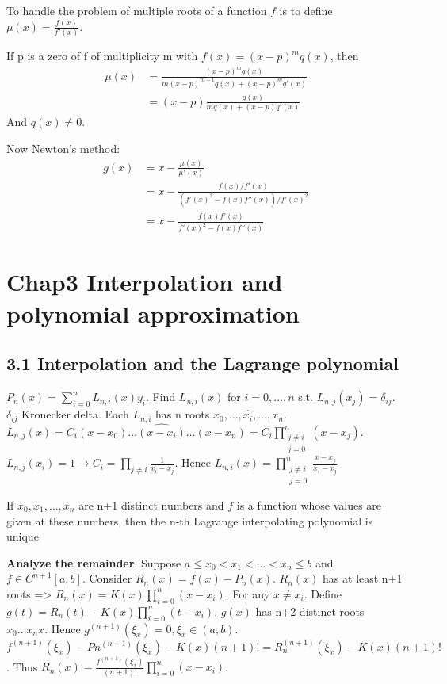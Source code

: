\documentclass[11pt]{article}
\begin{document}
To handle the problem of multiple roots of a function \(f\) is to define
\(\mu(x)=\frac{f(x)}{f'(x)}\).

If p is a zero of f of multiplicity m with \(f(x)=(x-p)^mq(x
   )\), then
\begin{align*}
\mu(x)&=\frac{(x-p)^mq(x)}{m(x-p)^{m-1}q(x)+(x-p)^mq'(x)}\\
&=(x-p)\frac{q(x)}{mq(x)+(x-p)q'(x)}
\end{align*}
And \(q(x)\neq 0\).

Now Newton's method:
\begin{align*}
g(x)&=x-\frac{\mu(x)}{\mu'(x)}\\
&=x-\frac{f(x)/f'(x)}{(f'(x)^2-f(x)f''(x))/f'(x)^2}\\
&=x-\frac{f(x)f'(x)}{f'(x)^2-f(x)f''(x)}
\end{align*}
\section{Chap3 Interpolation and polynomial approximation}
\label{sec:org01bca41}
\subsection{3.1 Interpolation and the Lagrange polynomial}
\label{sec:orgefa9bb8}
\(P_n(x)=\displaystyle\sum_{i=0}^nL_{n,i}(x)y_i\). Find \(L_{n,i}(x)\) for
\(i=0,\dots,n\) s.t. \(L_{n,j}(x_j)=\delta_{ij}\). \(\delta_{ij}\) Kronecker delta.
Each \(L_{n,i}\) has n roots \(x_0,\dots,\hat{x_i},\dots,x_n\).
\(L_{n,j}(x)=C_i(x-x_0)\dots\hat{(x-x_i)}\dots(x-x_n)=C_i \displaystyle
   \prod_{\substack{j\neq i\\j=0}}^n(x-x_j)\).
\(L_{n,j}(x_i)=1\to C_i=\displaystyle\prod_{j\neq i}\frac{1}{x_i-x_j}\).
Hence \(L_{n,i}(x)=\displaystyle\prod_{\substack{j\neq i\\j=0}}^n
   \frac{x-x_j}{x_i-x_j}\)

\begin{theorem}
If $x_0,x_1,\dots,x_n$ are n+1 distinct numbers and $f$ is a function whose values
are given at these numbers, then the n-th Lagrange interpolating polynomial 
is unique
\end{theorem}


\textbf{Analyze the remainder}. Suppose \(a\le x_0<x_1<\dots<x_n\le b\) and \(f\in
   C^{n+1}[a,b]\). Consider \(R_n(x)=f(x)-P_n(x)\).
\(R_n(x)\) has at least n+1 roots =>
\(R_n(x)=K(x)\displaystyle\prod_{i=0}^n(x-x_i)\).
For any \(x\neq x_i\). Define
\(g(t)=R_n(t)-K(x)\displaystyle\prod_{i=0}^n(t-x_i)\). \(g(x)\) has n+2 distinct
roots \(x_0\dots x_n x\). Hence \(g^{(n+1)}(\xi_x)=0,\xi_x\in(a,b)\).
\(f^{(n+1)}(\xi_x)-Pn^{(n+1)}(\xi_x)-K(x)(n+1)!=R_n^{(n+1)}(\xi_x)-K(x)(n+1)!\).
Thus
\(R_n(x)=\frac{f^{(n+1)}(\xi_x)}{(n+1)!}\displaystyle\prod_{i=0}^n(x-x_i)\).
\end{document}
